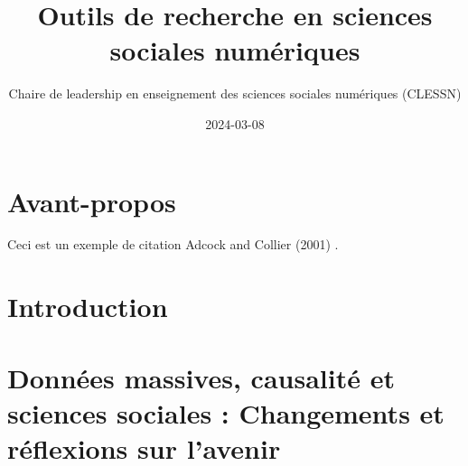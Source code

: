 \documentclass[
  letterpaper,
]{scrbook}
\title{Outils de recherche en sciences sociales numériques}
\author{Chaire de leadership en enseignement des sciences sociales
numériques (CLESSN)}
\date{2024-03-08}
\renewcommand*\contentsname{Table of contents}
\newcommand\contentsname{Table of contents}
\begin{document}
\frontmatter
\maketitle
\ifdefined\Shaded\renewenvironment{Shaded}{\begin{tcolorbox}[sharp corners, breakable, interior hidden, boxrule=0pt, frame hidden, borderline west={3pt}{0pt}{shadecolor}, enhanced]}{\end{tcolorbox}}\fi

\renewcommand*\contentsname{Table of contents}
{
\setcounter{tocdepth}{2}
\tableofcontents
}
\mainmatter
{}

\hypertarget{avant-propos}{%
\chapter*{Avant-propos}\label{avant-propos}}


Ceci est un exemple de citation Adcock and Collier (2001) .


\hypertarget{introduction}{%
\chapter*{Introduction}\label{introduction}}



\hypertarget{donnuxe9es-massives-causalituxe9-et-sciences-sociales-changements-et-ruxe9flexions-sur-lavenir}{%
\chapter{Données massives, causalité et sciences sociales : Changements
et réflexions sur
l'avenir}\label{donnuxe9es-massives-causalituxe9-et-sciences-sociales-changements-et-ruxe9flexions-sur-lavenir}}
\end{document}
